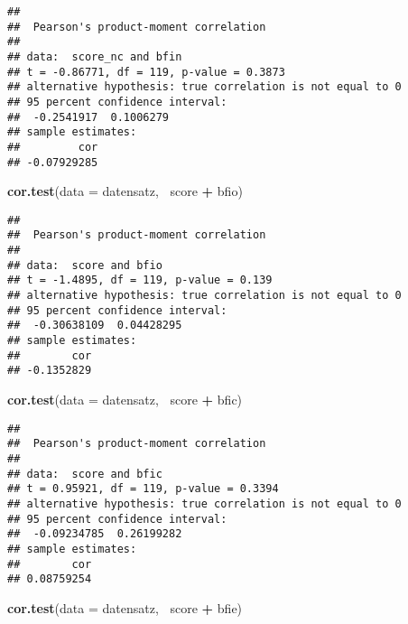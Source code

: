 \documentclass[]{article}
\newenvironment{Shaded}{\begin{snugshade}}{\end{snugshade}}
\newcommand{\KeywordTok}[1]{\textcolor[rgb]{0.13,0.29,0.53}{\textbf{#1}}}
\newcommand{\DataTypeTok}[1]{\textcolor[rgb]{0.13,0.29,0.53}{#1}}
\newcommand{\StringTok}[1]{\textcolor[rgb]{0.31,0.60,0.02}{#1}}
\newcommand{\OperatorTok}[1]{\textcolor[rgb]{0.81,0.36,0.00}{\textbf{#1}}}
\newcommand{\NormalTok}[1]{#1}
\begin{document}
\begin{verbatim}
## 
##  Pearson's product-moment correlation
## 
## data:  score_nc and bfin
## t = -0.86771, df = 119, p-value = 0.3873
## alternative hypothesis: true correlation is not equal to 0
## 95 percent confidence interval:
##  -0.2541917  0.1006279
## sample estimates:
##         cor 
## -0.07929285
\end{verbatim}

\begin{Shaded}
\begin{Highlighting}[]
\KeywordTok{cor.test}\NormalTok{(}\DataTypeTok{data =}\NormalTok{ datensatz, }\OperatorTok{~}\NormalTok{score }\OperatorTok{+}\StringTok{ }\NormalTok{bfio)}
\end{Highlighting}
\end{Shaded}

\begin{verbatim}
## 
##  Pearson's product-moment correlation
## 
## data:  score and bfio
## t = -1.4895, df = 119, p-value = 0.139
## alternative hypothesis: true correlation is not equal to 0
## 95 percent confidence interval:
##  -0.30638109  0.04428295
## sample estimates:
##        cor 
## -0.1352829
\end{verbatim}

\begin{Shaded}
\begin{Highlighting}[]
\KeywordTok{cor.test}\NormalTok{(}\DataTypeTok{data =}\NormalTok{ datensatz, }\OperatorTok{~}\NormalTok{score }\OperatorTok{+}\StringTok{ }\NormalTok{bfic)}
\end{Highlighting}
\end{Shaded}

\begin{verbatim}
## 
##  Pearson's product-moment correlation
## 
## data:  score and bfic
## t = 0.95921, df = 119, p-value = 0.3394
## alternative hypothesis: true correlation is not equal to 0
## 95 percent confidence interval:
##  -0.09234785  0.26199282
## sample estimates:
##        cor 
## 0.08759254
\end{verbatim}

\begin{Shaded}
\begin{Highlighting}[]
\KeywordTok{cor.test}\NormalTok{(}\DataTypeTok{data =}\NormalTok{ datensatz, }\OperatorTok{~}\NormalTok{score }\OperatorTok{+}\StringTok{ }\NormalTok{bfie)}
\end{Highlighting}
\end{Shaded}
\end{document}
